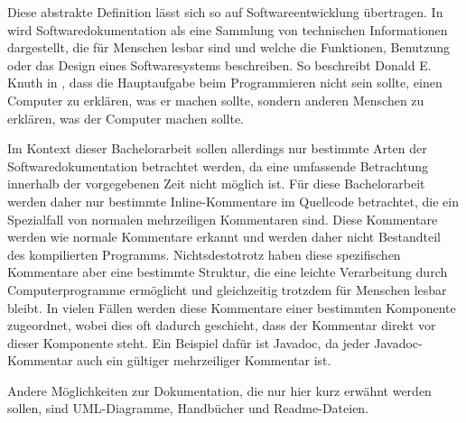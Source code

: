Diese abstrakte Definition lässt sich so auf Softwareentwicklung übertragen. In \cite[S. 125]{Softwaredocumentationandstandards} wird Softwaredokumentation als eine Sammlung von technischen Informationen dargestellt, die für Menschen lesbar sind und welche die Funktionen, Benutzung oder das Design eines Softwaresystems beschreiben. So beschreibt Donald E. Knuth in \cite[S. 97]{LiterateProgramming}, dass die Hauptaufgabe beim Programmieren nicht sein sollte, einen Computer zu erklären, was er machen sollte, sondern anderen Menschen zu erklären, was der Computer machen sollte.

Im Kontext dieser Bachelorarbeit sollen allerdings nur bestimmte Arten der Softwaredokumentation betrachtet werden, da eine umfassende Betrachtung innerhalb der vorgegebenen Zeit nicht möglich ist. 
Für diese Bachelorarbeit werden daher nur bestimmte Inline-Kommentare im Quellcode betrachtet, die ein Spezialfall von normalen mehrzeiligen Kommentaren sind. Diese Kommentare werden wie normale Kommentare erkannt und werden daher nicht Bestandteil des kompilierten Programms. Nichtsdestotrotz haben diese spezifischen Kommentare aber eine bestimmte Struktur, die eine leichte Verarbeitung durch Computerprogramme ermöglicht und gleichzeitig trotzdem für Menschen lesbar bleibt. In vielen Fällen werden diese Kommentare einer bestimmten Komponente zugeordnet, wobei dies oft dadurch geschieht, dass der Kommentar direkt vor dieser Komponente steht. Ein Beispiel dafür ist Javadoc, da jeder Javadoc-Kommentar auch ein gültiger mehrzeiliger Kommentar ist. 

Andere Möglichkeiten zur Dokumentation, die nur hier kurz erwähnt werden sollen, sind UML-Diagramme, Handbücher und  Readme-Dateien.



